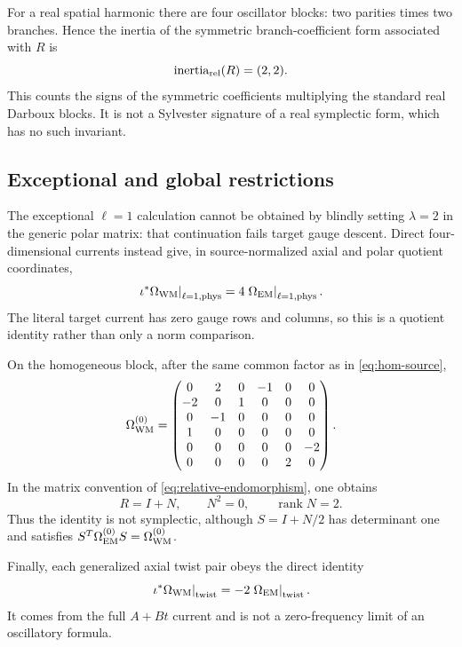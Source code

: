 \documentclass[11pt]{article}
\theoremstyle{remark}
\newcommand{\rank}{\operatorname{rank}}
\begin{document}
For a real spatial harmonic there are four oscillator blocks: two parities
times two branches. Hence the inertia of the symmetric branch-coefficient
form associated with $R$ is
\begin{equation}\label{eq:radiative-inertia}
 \operatorname{inertia}_{\rm rel}(R)=(2,2).
\end{equation}
This counts the signs of the symmetric coefficients multiplying the standard
real Darboux blocks. It is not a Sylvester signature of a real symplectic
form, which has no such invariant.

\subsection{Exceptional and global restrictions}
The exceptional $\ell=1$ calculation cannot be obtained by blindly setting
$\lambda=2$ in the generic polar matrix: that continuation fails target
gauge descent. Direct four-dimensional currents instead give, in
source-normalized axial and polar quotient coordinates,
\begin{equation}\label{eq:ell1-factor}
 \left.\iota^*\Omega_{\rm WM}\right|_{\ell=1,\rm phys}
 =4\left.\Omega_{\rm EM}\right|_{\ell=1,\rm phys}.
\end{equation}
The literal target current has zero gauge rows and columns, so this is a
quotient identity rather than only a norm comparison.

On the homogeneous block, after the same common factor as in
\eqref{eq:hom-source},
\begin{equation}\label{eq:hom-target}
 \Omega_{\rm WM}^{(0)}=
 \begin{pmatrix}
 0&2&0&-1&0&0\\ -2&0&1&0&0&0\\
 0&-1&0&0&0&0\\ 1&0&0&0&0&0\\
 0&0&0&0&0&-2\\ 0&0&0&0&2&0
 \end{pmatrix}.
\end{equation}
In the matrix convention of \eqref{eq:relative-endomorphism}, one obtains
\begin{equation}\label{eq:unipotent}
 R=I+N,\qquad N^2=0,\qquad\rank N=2.
\end{equation}
Thus the identity is not symplectic, although $S=I+N/2$ has determinant one
and satisfies $S^T\Omega_{\rm EM}^{(0)}S=\Omega_{\rm WM}^{(0)}$.

Finally, each generalized axial twist pair obeys the direct identity
\begin{equation}\label{eq:twist-factor}
 \left.\iota^*\Omega_{\rm WM}\right|_{\rm twist}
 =-2\left.\Omega_{\rm EM}\right|_{\rm twist}.
\end{equation}
It comes from the full $A+Bt$ current and is not a zero-frequency limit of an
oscillatory formula.
\end{document}

